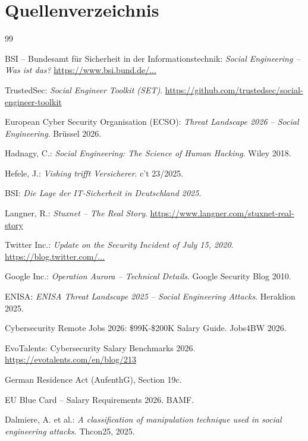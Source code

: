 \documentclass[10pt,a4paper]{article}
\begin{document}
	\section*{Quellenverzeichnis}
	\begin{thebibliography}{99}
		
		BSI – Bundesamt für Sicherheit in der Informationstechnik: \textit{Social Engineering – Was ist das?} \url{https://www.bsi.bund.de/...}
		
		TrustedSec: \textit{Social Engineer Toolkit (SET)}. \url{https://github.com/trustedsec/social-engineer-toolkit}
		
		European Cyber Security Organisation (ECSO): \textit{Threat Landscape 2026 – Social Engineering}. Brüssel 2026.
		
		Hadnagy, C.: \textit{Social Engineering: The Science of Human Hacking}. Wiley 2018.
		
		Hefele, J.: \textit{Vishing trifft Versicherer}. c't 23/2025.
		
		BSI: \textit{Die Lage der IT-Sicherheit in Deutschland 2025}.
		
		Langner, R.: \textit{Stuxnet – The Real Story}. \url{https://www.langner.com/stuxnet-real-story}
		
		Twitter Inc.: \textit{Update on the Security Incident of July 15, 2020}. \url{https://blog.twitter.com/...}
		
		Google Inc.: \textit{Operation Aurora – Technical Details}. Google Security Blog 2010.
		
		ENISA: \textit{ENISA Threat Landscape 2025 – Social Engineering Attacks}. Heraklion 2025.
		
		Cybersecurity Remote Jobs 2026: \$99K-\$200K Salary Guide. Jobs4BW 2026.
		
		EvoTalents: Cybersecurity Salary Benchmarks 2026. \url{https://evotalents.com/en/blog/213}
		
		German Residence Act (AufenthG), Section 19c.
		
		EU Blue Card – Salary Requirements 2026. BAMF.
		
		Dalmiere, A. et al.: \textit{A classification of manipulation technique used in social engineering attacks}. Thcon25, 2025.
		

\end{thebibliography}
\end{document}
